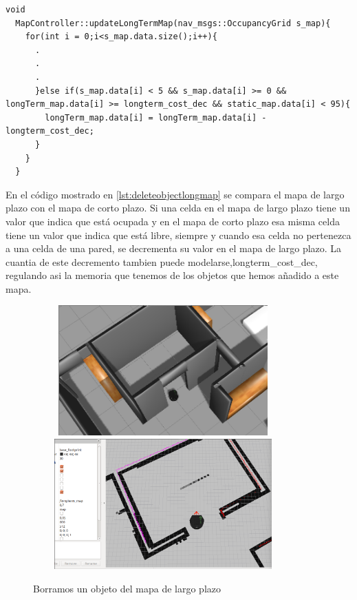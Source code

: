 \begin{lstlisting}[caption=Procedimiento para eliminar un objeto al mapa de largo plazo, label={lst:deleteobjectlongmap}]
  void
  MapController::updateLongTermMap(nav_msgs::OccupancyGrid s_map){
    for(int i = 0;i<s_map.data.size();i++){
      .
      .
      .
      }else if(s_map.data[i] < 5 && s_map.data[i] >= 0 && longTerm_map.data[i] >= longterm_cost_dec && static_map.data[i] < 95){
        longTerm_map.data[i] = longTerm_map.data[i] - longterm_cost_dec;
      }
    }
  } 

\end{lstlisting}

En el código mostrado en \ref{lst:deleteobjectlongmap} se compara el mapa de largo plazo con el mapa de corto plazo. Si una celda en el mapa de largo plazo tiene un valor que indica que está ocupada y en el mapa de corto plazo esa misma celda tiene un valor que indica que está libre, siempre y cuando esa celda no pertenezca a una celda de una pared, se decrementa su valor en el mapa de largo plazo. La cuantia de este decremento tambien puede modelarse,longterm\_cost\_dec, regulando asi la memoria que tenemos de los objetos que hemos añadido a este mapa.\\

\begin{figure}[H]
  \begin{center}
    \includegraphics[width=10cm,height=5cm]{img/cap4/deletingobject-gazebo}
    \includegraphics[width=10cm,height=5cm]{img/cap4/deletingobject-longmap}
  \end{center}
  \caption{Borramos un objeto del mapa de largo plazo}
  \label{fig:deleteobjectlongmap}
\end{figure}

